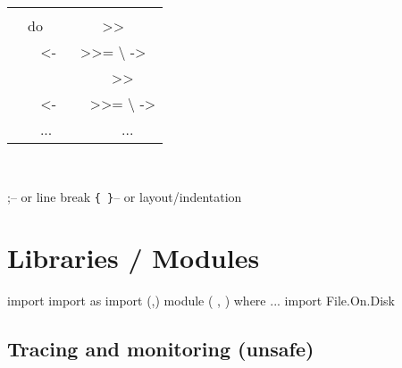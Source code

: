 \documentclass{refcard}
\newcommand{\la}{\textbackslash}
\begin{document}
\begin{tabular}{CC}
     &  \\
do         &  >>\\
~~~ <-    &  >>= \la {} ->\\
~~~        & ~~ >>\\
~~~ <-    & ~~ >>= \la {} ->\\
~~~...                  & ~~~~...\\
\end{tabular} \\[1ex]
\begin{ldesc}
	         ;\s\s\s\s-- or line break
	          \verb+{ }+\s\s-- or layout/indentation
\end{ldesc}



\section{Libraries / Modules}

\begin{ldesc}
	\li[importing]              import 
	  import  as 
	     import  (,)
	\li[declaring]
		module  \li
		\s\s(  \li
		\s\s,  \li
		\s\s) \li
		where \li
	    ...
	 import File.On.Disk
\end{ldesc}


\subsection{Tracing and monitoring (unsafe) \hfill {}}
\end{document}
